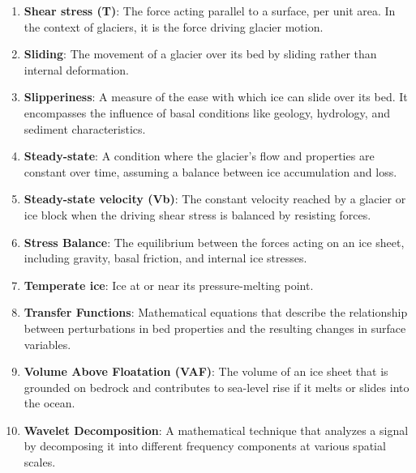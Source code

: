 \begin{enumerate}
\item \textbf{Shear stress (T)}: The force acting parallel to a surface, per unit area. In the context of glaciers, it is the force driving glacier motion.
\item \textbf{Sliding}: The movement of a glacier over its bed by sliding rather than internal deformation.
\item \textbf{Slipperiness}: A measure of the ease with which ice can slide over its bed. It encompasses the influence of basal conditions like geology, hydrology, and sediment characteristics.
\item \textbf{Steady-state}: A condition where the glacier's flow and properties are constant over time, assuming a balance between ice accumulation and loss.
\item \textbf{Steady-state velocity (Vb)}: The constant velocity reached by a glacier or ice block when the driving shear stress is balanced by resisting forces.
\item \textbf{Stress Balance}: The equilibrium between the forces acting on an ice sheet, including gravity, basal friction, and internal ice stresses.
\item \textbf{Temperate ice}: Ice at or near its pressure-melting point.
\item \textbf{Transfer Functions}: Mathematical equations that describe the relationship between perturbations in bed properties and the resulting changes in surface variables.
\item \textbf{Volume Above Floatation (VAF)}: The volume of an ice sheet that is grounded on bedrock and contributes to sea-level rise if it melts or slides into the ocean.
\item \textbf{Wavelet Decomposition}: A mathematical technique that analyzes a signal by decomposing it into different frequency components at various spatial scales.
\end{enumerate}